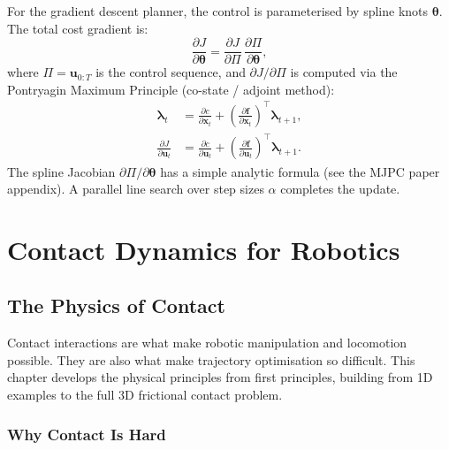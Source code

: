 \documentclass[11pt,twoside]{report}
\theoremstyle{definition}
\theoremstyle{plain}
\theoremstyle{remark}
\newcommand{\x}{\bm{x}}
\newcommand{\uu}{\bm{u}}
\newcommand{\f}{\bm{f}}
\newcommand{\0}{\bm{0}}
\begin{document}
For the gradient descent planner, the control is parameterised by
spline knots $\bm{\theta}$.  The total cost gradient is:
\begin{equation}
\frac{\partial J}{\partial\bm{\theta}}
=\frac{\partial J}{\partial\Pi}\,\frac{\partial\Pi}{\partial\bm{\theta}},
\end{equation}
where $\Pi=\uu_{0:T}$ is the control sequence, and
$\partial J/\partial\Pi$ is computed via the Pontryagin Maximum Principle
(co-state / adjoint method):
\begin{align}
\bm{\lambda}_{t}&=\frac{\partial c}{\partial\x_{t}}+\left(\frac{\partial\f}{\partial\x_{t}}\right)^{\!\top}\bm{\lambda}_{t+1},\\
\frac{\partial J}{\partial\uu_{t}}&=\frac{\partial c}{\partial\uu_{t}}+\left(\frac{\partial\f}{\partial\uu_{t}}\right)^{\!\top}\bm{\lambda}_{t+1}.
\end{align}
The spline Jacobian $\partial\Pi/\partial\bm{\theta}$ has a simple
analytic formula (see the MJPC paper appendix).
A parallel line search over step sizes $\alpha$ completes the update.


\part{Contact Dynamics for Robotics}

\chapter{The Physics of Contact}
\label{ch:contact-physics}

Contact interactions are what make robotic manipulation and locomotion
possible.  They are also what make trajectory optimisation so difficult.
This chapter develops the physical principles from first principles,
building from 1D examples to the full 3D frictional contact problem.

\section{Why Contact Is Hard}
\end{document}
